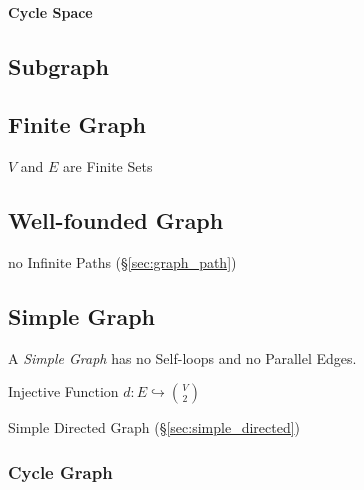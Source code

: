 \paragraph{Cycle Space}\label{sec:cycle_space}\hfill



\subsection{Subgraph}\label{sec:subgraphs}

\subsection{Finite Graph}\label{sec:finite_graph}

$V$ and $E$ are Finite Sets



\subsection{Well-founded Graph}\label{sec:wellfounded_graph}

no Infinite Paths (\S\ref{sec:graph_path})



\subsection{Simple Graph}\label{sec:simple_graph}

A \emph{Simple Graph} has no Self-loops and no Parallel Edges.

Injective Function $d : E \hookrightarrow {V \choose 2}$

Simple Directed Graph (\S\ref{sec:simple_directed})



\subsubsection{Cycle Graph}\label{sec:cycle_graph}

